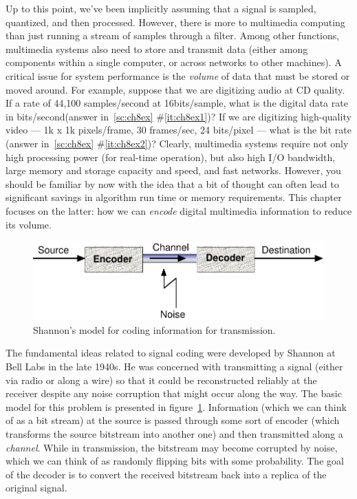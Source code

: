Up to this point, we've been implicitly assuming that a signal is
sampled, quantized, and then processed.  However, there is more to
multimedia computing than just running a stream of samples through a
filter.  Among other functions, multimedia systems also need to store
and transmit data (either among components within a single computer,
or across networks to other machines).  A critical issue for system
performance is the \emph{volume} of data that must be stored or moved
around. For example, suppose that we are digitizing audio at CD
quality. If a rate of 44,100 samples/second at 16bits/sample, what is
the digital data rate in bits/second(answer in~\ref{sc:ch8ex}
\#\ref{it:ch8ex1})?
If we are digitizing high-quality video --- 1k x 1k
pixels/frame, 30 frames/sec, 24 bits/pixel --- what is the bit
rate (answer in~\ref{sc:ch8ex}
\#\ref{it:ch8ex2})?
Clearly, multimedia systems require not only high processing power
(for real-time operation), but also high I/O bandwidth, large memory
and storage capacity and speed, and fast networks. However, you should
be familiar by now with the idea that a bit of thought can often lead
to significant savings in algorithm run time or memory
requirements. This chapter focuses on the latter: how we can
\emph{encode} digital multimedia information to reduce its volume.

\begin{figure}
\centerline{\includegraphics[width=\textwidth]{ch-comp/shannon}}
\caption{Shannon's model for coding information for
  transmission.\label{fg:shannon}}
\end{figure}

The fundamental ideas related to signal coding were developed by
Shannon at Bell Labs in the late 1940s. He was concerned with
transmitting a signal (either via radio or along a wire) so that it
could be reconstructed reliably at the receiver despite any noise
corruption that might occur along the way. The basic model for this
problem is presented in figure~\ref{fg:shannon}. Information (which we
can think of as a bit stream) at the source is passed through some
sort of encoder (which transforms the source bitstream into another
one) and then transmitted along a \emph{channel}. While in
transmission, the bitstream may become corrupted by noise, which we
can think of as randomly flipping bits with some probability. The goal
of the decoder is to convert the received bitstream back into a
replica of the original signal.

